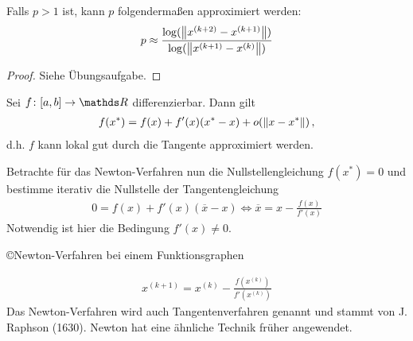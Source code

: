 \begin{Fole}
  Falls $p>1$ ist, kann $p$ folgendermaßen approximiert werden:
  \begin{gather*}
    p \approx \frac{\log(\nn[x^{(k+2)}-x^{(k+1)}])}
    {\log(\nn[x^{(k+1)}-x^{(k)}])}
  \end{gather*}
\end{Fole}

\begin{proof}
  Siehe Übungsaufgabe.
\end{proof}

Sei $f\colon[a,b]\to\R$ differenzierbar. Dann gilt
\begin{gather*}
  f(x^{*}) = f(x) + f'(x)(x^{*}-x)+o(\nn[x-x^{*}]) \, ,
\end{gather*} 
d.h. $f$ kann lokal gut durch die Tangente approximiert werden.

Betrachte für das Newton-Verfahren nun 
die Nullstellengleichung $f(x^{*}) = 0$
und bestimme iterativ die Nullstelle der Tangentengleichung
\begin{gather*}
  0=f(x) + f'(x)(\overline{x}-x) 
  \Leftrightarrow \overline{x}= x-\frac{f(x)}{f'(x)}
\end{gather*}
Notwendig ist hier die Bedingung $f'(x) \neq 0$.
\begin{image}{\copyright Newton-Verfahren bei einem Funktionsgraphen}
\end{image}
\label{im5.4}


\begin{gather}
  x^{(k+1)} = x^{(k)} - \frac{f(x^{(k)})}{f'(x^{(k)})}
  \label{V.4.1}
\end{gather}
Das Newton-Verfahren wird auch 
Tangentenverfahren genannt 
und stammt von J. Raphson (1630).
Newton hat eine ähnliche Technik früher angewendet.

